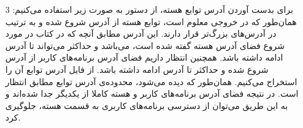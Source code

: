\begin{itemize}
	\item[3]
	برای بدست آوردن آدرس توابع هسته، از دستور 
	به صورت زیر استفاده می‌کنیم: 
	\lr{}
	همان‌طور که در خروجی معلوم است، توابع هسته از آدرس 
	شروع شده و به ترتیب در آدرس‌های بزرگ‌تر قرار دارند. این آدرس مطابق آنچه که در کتاب 
	در مورد شروع فضای آدرس 
	هسته گفته شده است، می‌باشد و حداکثر می‌تواند تا آدرس 
	ادامه داشته باشد. همچنین انتظار داریم فضای آدرس برنامه‌های کاربر از آدرس 
	شروع شده و حداکثر تا آدرس 
	ادامه داشته باشد. از فایل 
	آدرس توابع آن را استخراج می‌کنیم. همان‌طور که دیده‌ می‌شود، محدوده‌ی آدرس توابع مطابق انتظار است.
	\lr{}
	در نتیجه فضای آدرس برنامه‌های کاربر و هسته کاملا از یکدیگر جدا شده‌اند و به این طریق می‌توان از دسترسی برنامه‌های کاربری به قسمت هسته، جلوگیری کرد.
\end{itemize}
